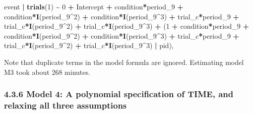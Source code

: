 \documentclass[
  man,floatsintext]{apa6}
\newenvironment{Shaded}{\begin{snugshade}}{\end{snugshade}}
\newcommand{\DecValTok}[1]{\textcolor[rgb]{0.00,0.00,0.81}{#1}}
\newcommand{\FunctionTok}[1]{\textcolor[rgb]{0.13,0.29,0.53}{\textbf{#1}}}
\newcommand{\NormalTok}[1]{#1}
\newcommand{\SpecialCharTok}[1]{\textcolor[rgb]{0.81,0.36,0.00}{\textbf{#1}}}
\begin{document}
\begin{Shaded}
\begin{Highlighting}[]
\NormalTok{        event }\SpecialCharTok{|} \FunctionTok{trials}\NormalTok{(}\DecValTok{1}\NormalTok{) }\SpecialCharTok{\textasciitilde{}} \DecValTok{0} \SpecialCharTok{+}\NormalTok{ Intercept }\SpecialCharTok{+} 
\NormalTok{                            condition}\SpecialCharTok{*}\NormalTok{period\_9 }\SpecialCharTok{+}  
\NormalTok{                            condition}\SpecialCharTok{*}\FunctionTok{I}\NormalTok{(period\_9}\SpecialCharTok{\^{}}\DecValTok{2}\NormalTok{) }\SpecialCharTok{+}  
\NormalTok{                            condition}\SpecialCharTok{*}\FunctionTok{I}\NormalTok{(period\_9}\SpecialCharTok{\^{}}\DecValTok{3}\NormalTok{) }\SpecialCharTok{+} 
\NormalTok{                            trial\_c}\SpecialCharTok{*}\NormalTok{period\_9 }\SpecialCharTok{+}  
\NormalTok{                            trial\_c}\SpecialCharTok{*}\FunctionTok{I}\NormalTok{(period\_9}\SpecialCharTok{\^{}}\DecValTok{2}\NormalTok{) }\SpecialCharTok{+}  
\NormalTok{                            trial\_c}\SpecialCharTok{*}\FunctionTok{I}\NormalTok{(period\_9}\SpecialCharTok{\^{}}\DecValTok{3}\NormalTok{) }\SpecialCharTok{+} 
\NormalTok{                            (}\DecValTok{1} \SpecialCharTok{+}\NormalTok{ condition}\SpecialCharTok{*}\NormalTok{period\_9 }\SpecialCharTok{+} 
\NormalTok{                            condition}\SpecialCharTok{*}\FunctionTok{I}\NormalTok{(period\_9}\SpecialCharTok{\^{}}\DecValTok{2}\NormalTok{) }\SpecialCharTok{+} 
\NormalTok{                            condition}\SpecialCharTok{*}\FunctionTok{I}\NormalTok{(period\_9}\SpecialCharTok{\^{}}\DecValTok{3}\NormalTok{) }\SpecialCharTok{+} 
\NormalTok{                            trial\_c}\SpecialCharTok{*}\NormalTok{period\_9 }\SpecialCharTok{+}  
\NormalTok{                            trial\_c}\SpecialCharTok{*}\FunctionTok{I}\NormalTok{(period\_9}\SpecialCharTok{\^{}}\DecValTok{2}\NormalTok{) }\SpecialCharTok{+}  
\NormalTok{                            trial\_c}\SpecialCharTok{*}\FunctionTok{I}\NormalTok{(period\_9}\SpecialCharTok{\^{}}\DecValTok{3}\NormalTok{) }\SpecialCharTok{|}\NormalTok{ pid), }
\end{Highlighting}
\end{Shaded}

\normalsize

Note that duplicate terms in the model formula are ignored. Estimating model M3 took about 268 minutes.

\subsubsection{4.3.6 Model 4: A polynomial specification of TIME, and relaxing all three assumptions}\label{model-4-a-polynomial-specification-of-time-and-relaxing-all-three-assumptions}
\end{document}
